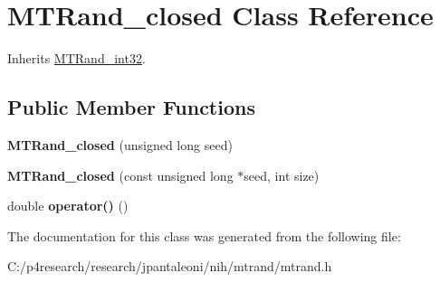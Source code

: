 \hypertarget{class_m_t_rand__closed}{
\section{\-M\-T\-Rand\-\_\-closed \-Class \-Reference}
\label{class_m_t_rand__closed}
}


\-Inherits \hyperlink{class_m_t_rand__int32}{\-M\-T\-Rand\-\_\-int32}.

\subsection*{\-Public \-Member \-Functions}
\begin{DoxyCompactItemize}
\item 
\hypertarget{class_m_t_rand__closed_ad5dc83250b16f22d4693a18b51816271}{
{\bfseries \-M\-T\-Rand\-\_\-closed} (unsigned long seed)}
\label{class_m_t_rand__closed_ad5dc83250b16f22d4693a18b51816271}

\item 
\hypertarget{class_m_t_rand__closed_a37e322f97253b7013823a267bcfe82d1}{
{\bfseries \-M\-T\-Rand\-\_\-closed} (const unsigned long $\ast$seed, int size)}
\label{class_m_t_rand__closed_a37e322f97253b7013823a267bcfe82d1}

\item 
\hypertarget{class_m_t_rand__closed_ad0c535263b63c95029523183f672f62d}{
double {\bfseries operator()} ()}
\label{class_m_t_rand__closed_ad0c535263b63c95029523183f672f62d}

\end{DoxyCompactItemize}


\-The documentation for this class was generated from the following file\-:\begin{DoxyCompactItemize}
\item 
\-C\-:/p4research/research/jpantaleoni/nih/mtrand/mtrand.\-h\end{DoxyCompactItemize}
